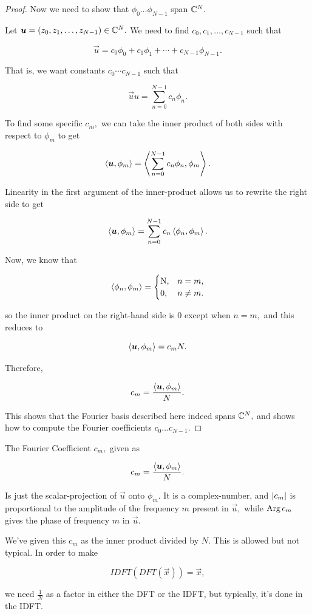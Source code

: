 \documentclass{article}
\begin{document}
\begin{proof}
Now we need to show that $\phi_0 \dots \phi_{N-1}$ span $\mathbb{C}^N.$

Let $\boldsymbol{u} = (z_0, z_1, \dots, z_{N-1}) \in \mathbb{C}^N.$ We need to find $c_0, c_1, \dots, c_{N-1}$ such that

\[ \vec{u} = c_0 \phi_0 + c_1 \phi_1 + \cdots + c_{N-1} \phi_{N-1}. \]

That is, we want constants $c_0 \cdots c_{N-1}$ such that

\[ \vec{u}u = \sum_{n=0}^{N-1} c_n \phi_n. \]

To find some specific $c_m,$ we can take the inner product of both sides with respect to $\phi_m$ to get

\[ \left\langle \boldsymbol{u}, \phi_m \right\rangle = \left\langle \sum_{n=0}^{N-1} c_n \phi_n, \phi_m \right\rangle. \]

\@{Linearity} in the first argument of the \@{inner-product} allows us to rewrite the right side to get

\[ \left\langle \boldsymbol{u}, \phi_m \right\rangle = \sum_{n=0}^{N-1} c_n  \left\langle \phi_n, \phi_m \right\rangle. \]

Now, we know that

\[ \left\langle \phi_n, \phi_m \right\rangle =
\begin{cases}
\text{N}, & n = m, \\
0, & n \neq m.
\end{cases} \]

so the inner product on the right-hand side is $0$ except when $n = m,$ and this reduces to

\[ \left\langle \boldsymbol{u}, \phi_m \right\rangle = c_m N. \]

Therefore,

\[ c_m = \frac{\left\langle \boldsymbol{u}, \phi_m \right\rangle}{N}. \]

This shows that the Fourier basis described here indeed spans $\mathbb{C}^N,$ and shows how to compute the Fourier coefficients $c_0 \dots c_{N-1}.$
\end{proof}

\detach

\begin{remark}
The Fourier Coefficient $c_m,$ given as

\[ c_m = \frac{\left\langle \boldsymbol{u}, \phi_m \right\rangle}{N}. \]

Is just the \@{scalar-projection} of $\vec{u}$ onto $\phi_m.$ It is a \@{complex-number}, and $\left| c_m \right|$ is proportional to the amplitude of the frequency $m$ present in $\vec{u},$ while $\operatorname{Arg}{c_m}$ gives the phase of frequency $m$ in $\vec{u}.$

\begin{note}
We've given this $c_m$ as the inner product divided by $N.$ This is allowed but not typical. In order to make

\[ IDFT(DFT(\vec{x})) = \vec{x}, \]

we need $\frac{1}{N}$ as a factor in either the DFT or the IDFT, but typically, it's done in the IDFT.

\end{note}

\end{remark}
\end{document}
